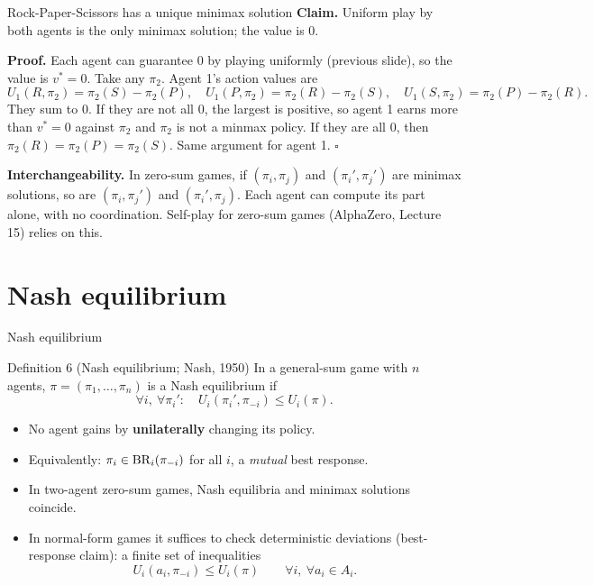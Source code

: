 \documentclass[aspectratio=169,11pt]{beamer}
\begin{document}
\begin{frame}{Rock-Paper-Scissors has a unique minimax solution}
  \textbf{Claim.} Uniform play by both agents is the only minimax solution; the value is 0.
  \bigskip

  \textbf{Proof.} Each agent can guarantee 0 by playing uniformly (previous slide), so the value is $v^* = 0$. Take any $\pi_2$. Agent 1's action values are
  \[
    U_1(R, \pi_2) = \pi_2(S) - \pi_2(P), \quad
    U_1(P, \pi_2) = \pi_2(R) - \pi_2(S), \quad
    U_1(S, \pi_2) = \pi_2(P) - \pi_2(R).
  \]
  They sum to 0. If they are not all 0, the largest is positive, so agent 1 earns more than $v^* = 0$ against $\pi_2$ and $\pi_2$ is not a minmax policy. If they are all 0, then $\pi_2(R) = \pi_2(P) = \pi_2(S)$. Same argument for agent 1. \hfill $\square$
  \bigskip

  \textbf{Interchangeability.} In zero-sum games, if $(\pi_i, \pi_j)$ and $(\pi_i', \pi_j')$ are minimax solutions, so are $(\pi_i, \pi_j')$ and $(\pi_i', \pi_j)$. Each agent can compute its part alone, with no coordination. Self-play for zero-sum games (AlphaZero, Lecture 15) relies on this.
\end{frame}

\section{Nash equilibrium}

\begin{frame}{Nash equilibrium}
  \begin{block}{Definition 6 (Nash equilibrium; Nash, 1950)}
    In a general-sum game with $n$ agents, $\pi = (\pi_1, \dots, \pi_n)$ is a Nash equilibrium if
    \[
      \forall i,\ \forall \pi_i' : \quad U_i(\pi_i', \pi_{-i}) \le U_i(\pi).
    \]
  \end{block}
  \begin{itemize}
    \item No agent gains by \textbf{unilaterally} changing its policy.
    \item Equivalently: $\pi_i \in \operatorname{BR}_i(\pi_{-i})$ for all $i$, a \emph{mutual} best response.
    \item In two-agent zero-sum games, Nash equilibria and minimax solutions coincide.
    \item In normal-form games it suffices to check deterministic deviations (best-response claim): a finite set of inequalities
      \[
        U_i(a_i, \pi_{-i}) \le U_i(\pi) \qquad \forall i,\ \forall a_i \in A_i .
      \]
  \end{itemize}
\end{frame}
\end{document}
